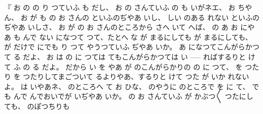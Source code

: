 『
お
の
の
り
つていふ
も
だし、
お
の
さんていふ
の
も
いがネエ、
お
ちやん、
お
が
も
の
お
さんの
といふのぢやあ
いし、
しい
のある
れない
といふのぢやあ
いしさ、
お
が
の
お
さんのところから
さへ
いて
へば、
の
あ
お
にやあ
も
んで
ない
になつて
つて、たとへ
な
が
まるにしても
が
まるにしても、
が
だけで
にでも
り
つて
やうつていふ
ぢやあ
いか。
あ
になつてこんがらかつて
る
だよ、
お
は
の
に
つては
てもこんがらかつては
い \------
ればするりと
けて
ふ
の
る
だよ。
だから
い
を
やあ
が
のこんがらかりの
の
に
つて、
を
つたり
を
つたりしてまごついて
るよりやあ、するりと
けて
つた
が
いか
れないよ。
は
いやあネ、
のところへ
て
お
ひな、
のやうに
のところで
を
に
て、
でも
んで
んでおいでが
いぢやあ
いか。
の
お
さんていふ
が
かぶつ〳〵
つたにしても、
のぽつちりも
